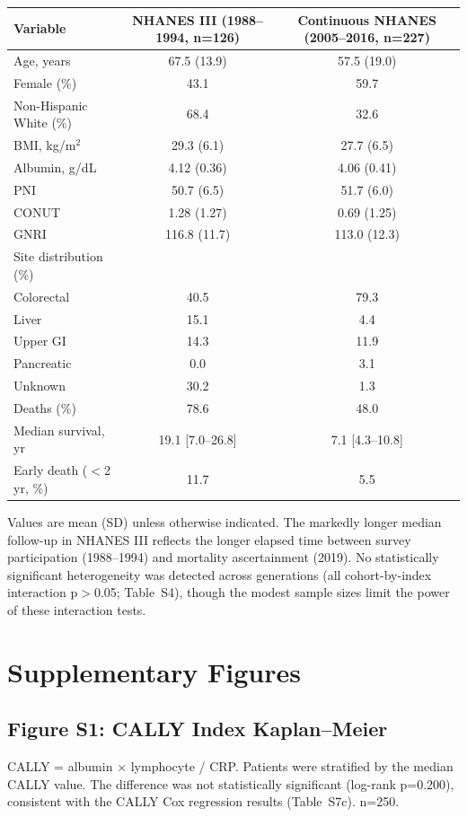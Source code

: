\documentclass[11pt,a4paper]{article}
\begin{document}
\begin{center}
\small
\begin{tabular}{lcc}
\toprule
Variable & NHANES III (1988--1994, n=126) & Continuous NHANES (2005--2016, n=227) \\
\midrule
Age, years & 67.5 (13.9) & 57.5 (19.0) \\
Female (\%) & 43.1 & 59.7 \\
Non-Hispanic White (\%) & 68.4 & 32.6 \\
BMI, kg/m$^2$ & 29.3 (6.1) & 27.7 (6.5) \\
Albumin, g/dL & 4.12 (0.36) & 4.06 (0.41) \\
PNI & 50.7 (6.5) & 51.7 (6.0) \\
CONUT & 1.28 (1.27) & 0.69 (1.25) \\
GNRI & 116.8 (11.7) & 113.0 (12.3) \\
Site distribution (\%) & & \\
\quad Colorectal & 40.5 & 79.3 \\
\quad Liver & 15.1 & 4.4 \\
\quad Upper GI & 14.3 & 11.9 \\
\quad Pancreatic & 0.0 & 3.1 \\
\quad Unknown & 30.2 & 1.3 \\
Deaths (\%) & 78.6 & 48.0 \\
Median survival, yr & 19.1 [7.0--26.8] & 7.1 [4.3--10.8] \\
Early death ($<$2 yr, \%) & 11.7 & 5.5 \\
\bottomrule
\end{tabular}
\end{center}

Values are mean (SD) unless otherwise indicated. The markedly longer median follow-up in NHANES III reflects the longer elapsed time between survey participation (1988--1994) and mortality ascertainment (2019). No statistically significant heterogeneity was detected across generations (all cohort-by-index interaction p$>$0.05; Table~S4), though the modest sample sizes limit the power of these interaction tests.

\section*{Supplementary Figures}

\subsection*{Figure S1: CALLY Index Kaplan--Meier}
CALLY = albumin $\times$ lymphocyte / CRP. Patients were stratified by the median CALLY value. The difference was not statistically significant (log-rank p=0.200), consistent with the CALLY Cox regression results (Table~S7c). n=250.
\end{document}
